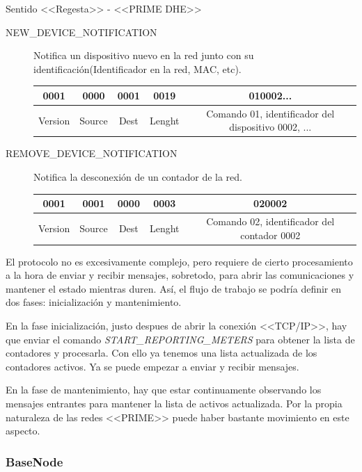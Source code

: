 Sentido <<Regesta>> - <<PRIME DHE>>
\begin{description}
	\item[NEW\_DEVICE\_NOTIFICATION] Notifica un dispositivo nuevo en la red junto con su identificación(Identificador en la red, MAC, etc). 
	\begin{table}[h]
		\centering
		\begin{tabular}{cccccccc}
			\midrule
			0001 & 0000 & 0001 & 0019 & \multicolumn{4}{c}{010002...}\\ \midrule
			Version & Source & Dest & Lenght & \multicolumn{4}{c}{Comando 01, identificador del dispositivo 0002, ...} \\ 
			\bottomrule
		\end{tabular}
	\end{table}
	\item[REMOVE\_DEVICE\_NOTIFICATION] Notifica la desconexión de un contador de la red.
	\begin{table}[h]
		\centering
		\begin{tabular}{cccccccc}
			\midrule
			0001 & 0001 & 0000 & 0003 & \multicolumn{4}{c}{020002}\\ \midrule
			Version & Source & Dest & Lenght & \multicolumn{4}{c}{Comando 02, identificador del contador 0002} \\ 
			\bottomrule
		\end{tabular}
	\end{table}
\end{description}

El protocolo no es excesivamente complejo, pero requiere de cierto procesamiento a la hora de enviar y recibir mensajes, sobretodo, para abrir las comunicaciones y mantener el estado mientras duren. Así, el flujo de trabajo se podría definir en dos fases: inicialización y mantenimiento. 

En la fase inicialización, justo despues de abrir la conexión <<TCP/IP>>, hay que enviar el comando \textsl{START\_REPORTING\_METERS} para obtener la lista de contadores y procesarla. Con ello ya tenemos una lista actualizada de los contadores activos. Ya se puede empezar a enviar y recibir mensajes.

En la fase de mantenimiento, hay que estar continuamente observando los mensajes entrantes para mantener la lista de activos actualizada. Por la propia naturaleza de las redes <<PRIME>> puede haber bastante movimiento en este aspecto.


\subsubsection{BaseNode}


